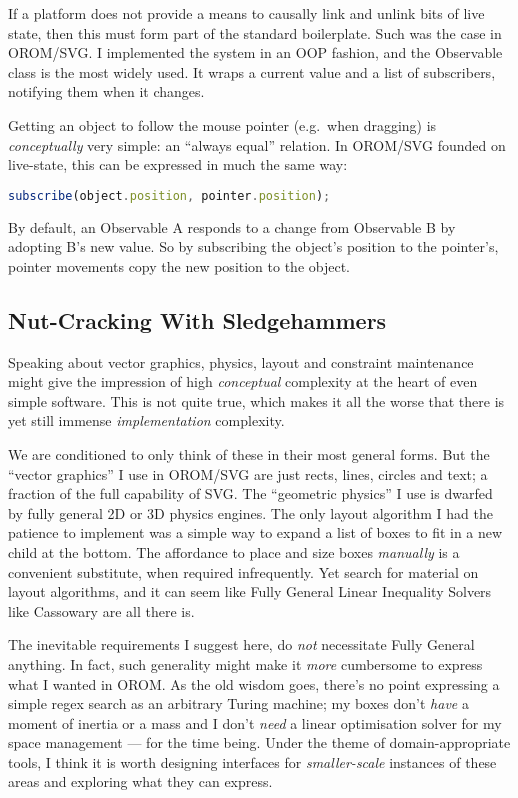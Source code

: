 If a platform does not provide a means to causally link and unlink bits
of live state, then this must form part of the standard boilerplate.
Such was the case in OROM/SVG. I implemented the system in an OOP
fashion, and the Observable class is the most widely used. It wraps a
current value and a list of subscribers, notifying them when it changes.

Getting an object to follow the mouse pointer (e.g.~when dragging) is
\emph{conceptually} very simple: an ``always equal'' relation. In
OROM/SVG founded on live-state, this can be expressed in much the same
way:

\begin{lstlisting}[language=JavaScript, numbers=none]
subscribe(object.position, pointer.position);
\end{lstlisting}

By default, an Observable A responds to a change from Observable B by
adopting B's new value. So by subscribing the object's position to the
pointer's, pointer movements copy the new position to the object.

\hypertarget{nut-cracking-with-sledgehammers}{%
\subsection{Nut-Cracking With
Sledgehammers}\label{nut-cracking-with-sledgehammers}}

Speaking about vector graphics, physics, layout and constraint
maintenance might give the impression of high \emph{conceptual}
complexity at the heart of even simple software. This is not quite true,
which makes it all the worse that there is yet still immense
\emph{implementation} complexity.

We are conditioned to only think of these in their most general forms.
But the ``vector graphics'' I use in OROM/SVG are just rects, lines,
circles and text; a fraction of the full capability of SVG. The
``geometric physics'' I use is dwarfed by fully general 2D or 3D physics
engines. The only layout algorithm I had the patience to implement was a
simple way to expand a list of boxes to fit in a new child at the
bottom. The affordance to place and size boxes \emph{manually} is a
convenient substitute, when required infrequently. Yet search for
material on layout algorithms, and it can seem like Fully General Linear
Inequality Solvers like Cassowary \cite{cassowary} are all there is.

The inevitable requirements I suggest here, do \emph{not} necessitate
Fully General anything. In fact, such generality might make it
\emph{more} cumbersome to express what I wanted in OROM. As the old
wisdom goes, there's no point expressing a simple regex search as an
arbitrary Turing machine; my boxes don't \emph{have} a moment of inertia
or a mass and I don't \emph{need} a linear optimisation solver for my
space management --- for the time being. Under the theme of
domain-appropriate tools, I think it is worth designing interfaces for
\emph{smaller-scale} instances of these areas and exploring what they
can express.

